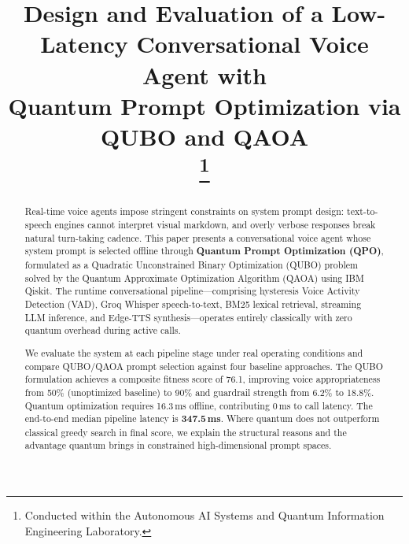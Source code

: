 \documentclass[conference]{IEEEtran}
\begin{document}
\title{Design and Evaluation of a Low-Latency Conversational Voice Agent with\\
Quantum Prompt Optimization via QUBO and QAOA\\
\thanks{Conducted within the Autonomous AI Systems and Quantum Information Engineering Laboratory.}}

\author{
    \and
}

\maketitle

\begin{abstract}
Real-time voice agents impose stringent constraints on system prompt design: text-to-speech engines cannot interpret visual markdown, and overly verbose responses break natural turn-taking cadence. This paper presents a conversational voice agent whose system prompt is selected offline through \textbf{Quantum Prompt Optimization (QPO)}, formulated as a Quadratic Unconstrained Binary Optimization (QUBO) problem solved by the Quantum Approximate Optimization Algorithm (QAOA) using IBM Qiskit. The runtime conversational pipeline---comprising hysteresis Voice Activity Detection (VAD), Groq Whisper speech-to-text, BM25 lexical retrieval, streaming LLM inference, and Edge-TTS synthesis---operates entirely classically with zero quantum overhead during active calls.

We evaluate the system at each pipeline stage under real operating conditions and compare QUBO/QAOA prompt selection against four baseline approaches. The QUBO formulation achieves a composite fitness score of 76.1, improving voice appropriateness from 50\% (unoptimized baseline) to 90\% and guardrail strength from 6.2\% to 18.8\%. Quantum optimization requires 16.3\,ms offline, contributing 0\,ms to call latency. The end-to-end median pipeline latency is \textbf{347.5\,ms}. Where quantum does not outperform classical greedy search in final score, we explain the structural reasons and the advantage quantum brings in constrained high-dimensional prompt spaces.
\end{abstract}
\end{document}
